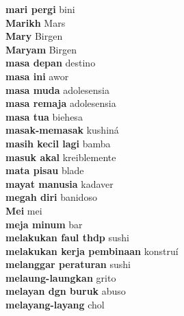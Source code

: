 \textbf{ mari pergi  } bini \\
\textbf{ Marikh  } Mars \\
\textbf{ Mary  } Birgen \\
\textbf{ Maryam  } Birgen \\
\textbf{ masa depan  } destino \\
\textbf{ masa ini  } awor \\
\textbf{ masa muda  } adolesensia \\
\textbf{ masa remaja  } adolesensia \\
\textbf{ masa tua  } biehesa \\
\textbf{ masak-memasak  } kushiná \\
\textbf{ masih kecil lagi  } bamba \\
\textbf{ masuk akal  } kreiblemente \\
\textbf{ mata pisau  } blade \\
\textbf{ mayat manusia  } kadaver \\
\textbf{ megah diri  } banidoso \\
\textbf{ Mei  } mei \\
\textbf{ meja minum  } bar \\
\textbf{ melakukan faul thdp  } sushi \\
\textbf{ melakukan kerja pembinaan  } konstruí \\
\textbf{ melanggar peraturan  } sushi \\
\textbf{ melaung-laungkan  } grito \\
\textbf{ melayan dgn buruk  } abuso \\
\textbf{ melayang-layang  } chol \\
